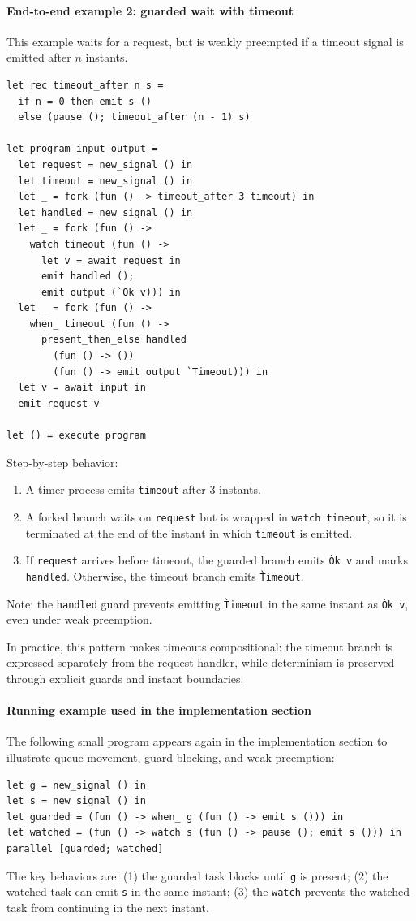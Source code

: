 \paragraph{End-to-end example 2: guarded wait with timeout}
This example waits for a request, but is weakly preempted if a timeout signal
is emitted after $n$ instants.
\begin{lstlisting}[style=tempo]
let rec timeout_after n s =
  if n = 0 then emit s ()
  else (pause (); timeout_after (n - 1) s)

let program input output =
  let request = new_signal () in
  let timeout = new_signal () in
  let _ = fork (fun () -> timeout_after 3 timeout) in
  let handled = new_signal () in
  let _ = fork (fun () ->
    watch timeout (fun () ->
      let v = await request in
      emit handled ();
      emit output (`Ok v))) in
  let _ = fork (fun () ->
    when_ timeout (fun () ->
      present_then_else handled
        (fun () -> ())
        (fun () -> emit output `Timeout))) in
  let v = await input in
  emit request v

let () = execute program
\end{lstlisting}
Step-by-step behavior:
\begin{enumerate}
\item A timer process emits \texttt{timeout} after 3 instants.
\item A forked branch waits on \texttt{request} but is wrapped in
  \texttt{watch timeout}, so it is terminated at the end of the instant in
  which \texttt{timeout} is emitted.
\item If \texttt{request} arrives before timeout, the guarded branch emits
  \texttt{\`Ok v} and marks \texttt{handled}. Otherwise, the timeout branch
  emits \texttt{\`Timeout}.
\end{enumerate}
Note: the \texttt{handled} guard prevents emitting \texttt{\`Timeout} in the
same instant as \texttt{\`Ok v}, even under weak preemption.

In practice, this pattern makes timeouts compositional: the timeout branch is
expressed separately from the request handler, while determinism is preserved
through explicit guards and instant boundaries.

\paragraph{Running example used in the implementation section}\label{ex:guard-watch}
The following small program appears again in the implementation section to
illustrate queue movement, guard blocking, and weak preemption:
\begin{lstlisting}[style=tempo]
let g = new_signal () in
let s = new_signal () in
let guarded = (fun () -> when_ g (fun () -> emit s ())) in
let watched = (fun () -> watch s (fun () -> pause (); emit s ())) in
parallel [guarded; watched]
\end{lstlisting}
The key behaviors are: (1) the guarded task blocks until \texttt{g} is present;
(2) the watched task can emit \texttt{s} in the same instant; (3) the
\texttt{watch} prevents the watched task from continuing in the next instant.

